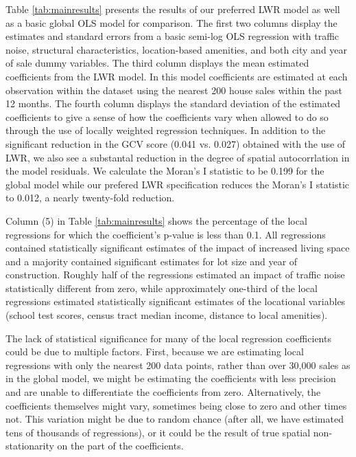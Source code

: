 \documentclass{article}\usepackage{graphicx, color}
\begin{document}
Table \ref{tab:mainresults} presents the results of our preferred LWR model as well as a basic global OLS model for comparison. The first two columns display the estimates and standard errors from a basic semi-log OLS regression with traffic noise, structural characteristics, location-based amenities, and both city and year of sale dummy variables. The third column displays the mean estimated coefficients from the LWR model. In this model coefficients are estimated at each observation within the dataset using the nearest 200 house sales within the past 12 months. The fourth column displays the standard deviation of the estimated coefficients to give a sense of how the coefficients vary when allowed to do so through the use of locally weighted regression techniques. In addition to the significant reduction in the GCV score (0.041 vs. 0.027) obtained with the use of LWR, we also see a substantal reduction in the degree of spatial autocorrlation in the model residuals. We calculate the Moran’s I statistic to be 0.199 for the global model while our prefered LWR specification reduces the Moran's I statistic to 0.012, a nearly twenty-fold reduction. 

Column (5) in Table \ref{tab:mainresults} shows the percentage of the local regressions for which the coefficient's p-value is less than 0.1. All regressions contained statistically significant estimates of the impact of increased living space and a majority contained significant estimates for lot size and year of construction. Roughly half of the regressions estimated an impact of traffic noise statistically different from zero, while approximately one-third of the local regressions estimated statistically significant estimates of the locational variables (school test scores, census tract median income, distance to local amenities).

The lack of statistical significance for many of the local regression coefficients could be due to multiple factors. First, because we are estimating local regressions with only the nearest 200 data points, rather than over 30,000 sales as in the global model, we might be estimating the coefficients with less precision and are unable to differentiate the coefficients from zero. Alternatively, the coefficients themselves might vary, sometimes being close to zero and other times not. This variation might be due to random chance (after all, we have estimated tens of thousands of regressions), or it could be the result of true spatial non-stationarity on the part of the coefficients. 
\end{document}

